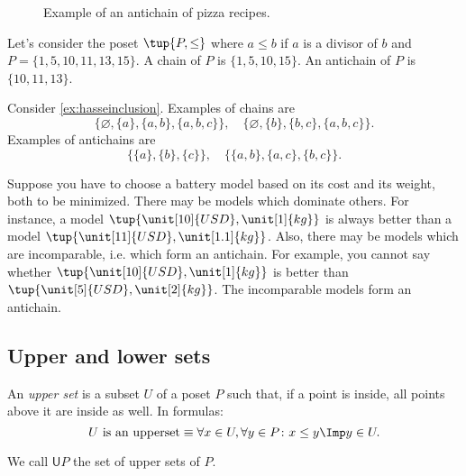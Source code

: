 \begin{figure}[h!]
\begin{center}
\end{center}
\caption{Example of an antichain of pizza recipes. \label{fig:antichain}}
\end{figure}


\begin{example}
Let's consider the poset $\tup{P,\leq}$ where $a\leq b$ if $a$ is a divisor of $b$ and $P=\{1,5,10,11,13,15\}$. A chain of $P$ is $\{1,5,10,15\}$. An antichain of $P$ is $\{10,11,13\}$.
\end{example}

\begin{example}
Consider \cref{ex:hasseinclusion}. Examples of chains are 
\begin{equation}
    \{\varnothing,\{a\},\{a,b\},\{a,b,c\}\}, \quad  \{\varnothing,\{b\},\{b,c\},\{a,b,c\}\}.
\end{equation}
Examples of antichains are
\begin{equation}
    \{\{a\},\{b\},\{c\}\}, \quad \{ \{a,b\},\{a,c\}, \{b,c\}\}.
\end{equation}
\end{example}

\begin{example}
\label{ex:battery}
Suppose you have to choose a battery model based on its cost and its weight, both to be minimized. There may be models which dominate others. For instance, a model $\tup{\unit[10]{USD},\unit[1]{kg}}$ is always better than a model $\tup{\unit[11]{USD},\unit[1.1]{kg}}$. Also, there may be models which are incomparable, i.e. which form an antichain. For example, you cannot say whether $\tup{\unit[10]{USD},\unit[1]{kg}}$ is better than  $\tup{\unit[5]{USD},\unit[2]{kg}}$. The incomparable models form an antichain.
\end{example}

\subsection{Upper and lower sets}

\begin{definition}
\label{def:upperset}
An \emph{upper set} is a subset $U$ of a poset $P$ such
that, if a point is inside, all points above it are inside as well.
In formulas:
\begin{equation}
\text{$U$ is an upperset} \equiv \forall x\in U, \forall y\in P\colon x\leq y \Imp y\in U.
\end{equation}
\end{definition}
\begin{remark}
We call $\mathsf{U}P$ the set of upper sets of $P$.
\end{remark}



